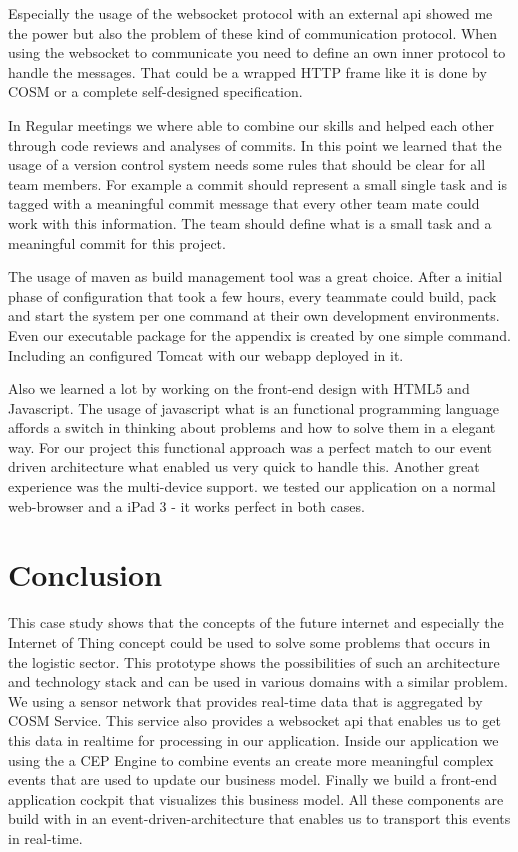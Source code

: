 \documentclass{acm_proc_article-sp}
\begin{document}
Especially the usage of the websocket protocol with an external api showed me the power but also the problem of these kind of communication protocol. When using the websocket  to communicate you need to define an own inner protocol to handle the messages. 
That could be a wrapped HTTP frame like it is done by COSM or a complete self-designed specification.

In Regular meetings we where able to combine our skills and helped each other through code reviews and analyses of commits. In this point we learned that the usage of a version control system needs some rules that should be clear for all team members. For example a commit should represent a small single task and is tagged with a meaningful commit message that every other team mate could work with this information. The team should define what is a small task and a meaningful commit for this project.

The usage of maven as build management tool was a great choice. After a initial phase of configuration that took a few hours, every teammate could build, pack and start the system per one command at their own development environments. Even our executable package for the appendix is created by one simple command. Including an configured Tomcat with our webapp deployed in it.

Also we learned a lot by working on the front-end design with HTML5 and Javascript.
The usage of javascript what is an functional programming language affords a switch in thinking about problems and how to solve them in a elegant way.
For our project this functional approach was a perfect match to our event driven architecture what enabled us very quick to handle this.
Another great experience was the multi-device support. we tested our application on a normal web-browser and a iPad 3 - it works perfect in both cases.

\section{Conclusion}
\label{sec:Conclusion}
This case study shows that the concepts of the future internet and especially the Internet of Thing concept could be used to solve some problems that occurs in the logistic sector.
This prototype shows the possibilities of such an architecture and technology stack and can be used in various domains with a similar problem. 
We using a sensor network that provides real-time data that is aggregated by COSM Service. This service also provides a websocket api that enables us to get this data in realtime for processing in our application. Inside our application we using the a CEP Engine to combine events an create more meaningful complex events that are used to update our business model. Finally we build a front-end application cockpit that visualizes  this business model.
All these components are build with in an event-driven-architecture that enables us to transport this events in real-time.
\end{document}
